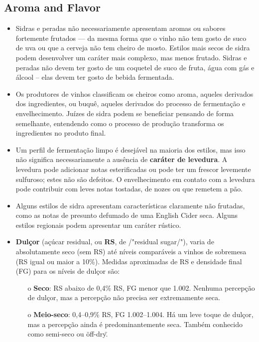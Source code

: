 \subsection*{Aroma and Flavor}

\begin{itemize}
\item Sidras e peradas não necessariamente apresentam aromas ou sabores fortemente frutados — da mesma forma que o vinho não tem gosto de suco de uva ou que a cerveja não tem cheiro de mosto. Estilos mais secos de sidra podem desenvolver um caráter mais complexo, mas menos frutado. Sidras e peradas não devem ter gosto de um coquetel de suco de fruta, água com gás e álcool – elas devem ter gosto de bebida fermentada.
\item Os produtores de vinhos classificam os cheiros como aroma, aqueles derivados dos ingredientes, ou buquê, aqueles derivados do processo de fermentação e envelhecimento. Juízes de sidra podem se beneficiar pensando de forma semelhante, entendendo como o processo de produção transforma os ingredientes no produto final.
\item Um perfil de fermentação limpo é desejável na maioria dos estilos, mas isso não significa necessariamente a ausência de \textbf{caráter de levedura}. A levedura pode adicionar notas esterificadas ou pode ter um frescor levemente sulfuroso; estes não são defeitos. O envelhecimento em contato com a levedura pode contribuir com leves notas tostadas, de nozes ou que remetem a pão.
\item Alguns estilos de sidra apresentam características claramente não frutadas, como as notas de presunto defumado de uma English Cider seca. Alguns estilos regionais podem apresentar um caráter rústico.
\item \textbf{Dulçor} (açúcar residual, ou \textbf{RS}, de /"residual sugar/"), varia de absolutamente seco (sem RS) até níveis comparáveis a vinhos de sobremesa (RS igual ou maior a 10\%). Medidas aproximadas de RS e densidade final (FG) para os níveis de dulçor são:
  \begin{itemize}
  \item[o] \textbf{Seco}: RS abaixo de 0,4\% RS, FG menor que 1.002. Nenhuma percepção de dulçor, mas a percepção não precisa ser extremamente seca.
  \item[o] \textbf{Meio-seco}: 0,4–0,9\% RS, FG 1.002–1.004. Há um leve toque de dulçor, mas a percepção ainda é predominantemente seca. Também conhecido como semi-seco ou \"off-dry\".

\end{itemize}
\end{itemize}
